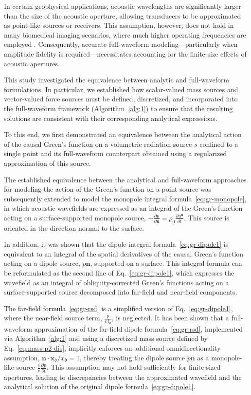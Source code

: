 \documentclass[11pt,reqno]{amsart}
\theoremstyle{remark}
\theoremstyle{italic_lemma}
\newcommand{\bx}{\boldsymbol{x}}
\newcommand{\bn}{\boldsymbol{n}}
\newcommand{\fd}{\mathfrak{d}}
\begin{document}
In certain geophysical applications, acoustic wavelengths are significantly larger than the size of the acoustic aperture, allowing transducers to be approximated as point-like sources or receivers. This assumption, however, does not hold in many biomedical imaging scenarios, where much higher operating frequencies are employed \cite{Xu,Burgholzer1}. Consequently, accurate full-waveform modeling—particularly when amplitude fidelity is required—necessitates accounting for the finite-size effects of acoustic apertures.


This study investigated the equivalence between analytic and full-waveform formulations. In particular, we established how scalar-valued mass sources and vector-valued force sources must be defined, discretized, and incorporated into the full-waveform framework (Algorithm~\ref{alg:1}) to ensure that the resulting solutions are consistent with their corresponding analytical expressions. 


To this end, we first demonstrated an equivalence between the analytical action of the causal Green’s function on a volumetric radiation source \(s\) confined to a single point and its full-waveform counterpart obtained using a regularized approximation of this source.




The established equivalence between the analytical and full-waveform approaches for modeling the action of the Green's function on a point source was subsequently extended to model the monopole integral formula~\eqref{eq:gr-monopole}, in which acoustic wavefields are expressed as an integral of the Green's function acting on a surface-supported monopole source, $-\frac{\partial p}{\partial \bn} = \rho_0 \frac{\partial u^{\bn}}{\partial t}$. This source is oriented in the direction normal to the surface.


In addition, it was shown that the dipole integral formula~\eqref{eq:gr-dipole1} is equivalent to an integral of the spatial derivatives of the causal Green's function acting on a dipole source, \( p \bn \), supported on a surface. This integral formula can be reformulated as the second line of Eq.~\eqref{eq:gr-dipole1}, which expresses the wavefield as an integral of obliquity-corrected Green's functions acting on a surface-supported source decomposed into far-field and near-field components.

The far-field formula~\eqref{eq:gr-rsd} is a simplified version of Eq.~\eqref{eq:gr-dipole1}, where the near-field source term, \( \frac{p} { c \, t_{\fd} } \), is neglected. It has been shown that a full-waveform approximation of the far-field dipole formula~\eqref{eq:gr-rsd}, implemented via Algorithm~\ref{alg:1} and using a discretized mass source defined by Eq.~\eqref{eq:mass-p2-dis}, implicitly enforces an additional omnidirectionality assumption, \( \bn \cdot \bx_{\fd} / x_{\fd} = 1 \), thereby treating the dipole source \( p \bn \) as a monopole-like source \( \frac{1}{c} \frac{\partial p}{\partial t} \). This assumption may not hold sufficiently for finite-sized apertures, leading to discrepancies between the approximated wavefield and the analytical solution of the original dipole formula~\eqref{eq:gr-dipole1}.
\end{document}
